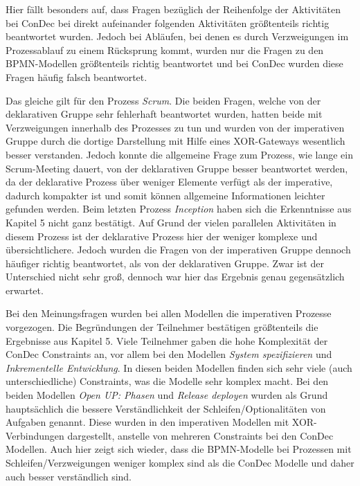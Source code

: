 Hier fällt besonders auf, dass Fragen bezüglich der Reihenfolge der Aktivitäten bei ConDec bei direkt aufeinander folgenden Aktivitäten größtenteils richtig beantwortet wurden. Jedoch bei Abläufen, bei denen es durch Verzweigungen im Prozessablauf zu einem Rücksprung kommt, wurden nur die Fragen zu den BPMN-Modellen größtenteils richtig beantwortet und bei ConDec wurden diese Fragen häufig falsch beantwortet.\newline

Das gleiche gilt für den Prozess \textit{Scrum}. Die beiden Fragen, welche von der deklarativen Gruppe sehr fehlerhaft beantwortet wurden, hatten beide mit Verzweigungen innerhalb des Prozesses zu tun und wurden von der imperativen Gruppe durch die dortige Darstellung mit Hilfe eines XOR-Gateways wesentlich besser verstanden. Jedoch konnte die allgemeine Frage zum Prozess, wie lange ein Scrum-Meeting dauert, von der deklarativen Gruppe besser beantwortet werden, da der deklarative Prozess über weniger Elemente verfügt als der imperative, dadurch kompakter ist und somit können allgemeine Informationen leichter gefunden werden. \newline
Beim letzten Prozess \textit{Inception} haben sich die Erkenntnisse aus Kapitel 5 nicht ganz bestätigt. Auf Grund der vielen parallelen Aktivitäten in diesem Prozess ist der deklarative Prozess hier der weniger komplexe und übersichtlichere. Jedoch wurden die Fragen von der imperativen Gruppe dennoch häufiger richtig beantwortet, als von der deklarativen Gruppe. Zwar ist der Unterschied nicht sehr groß, dennoch war hier das Ergebnis genau gegensätzlich erwartet.\newline

Bei den Meinungsfragen wurden bei allen Modellen die imperativen Prozesse vorgezogen. Die Begründungen der Teilnehmer bestätigen größtenteils die Ergebnisse aus Kapitel 5. Viele Teilnehmer gaben die hohe Komplexität der ConDec Constraints an, vor allem bei den Modellen \textit{System spezifizieren} und \textit{Inkrementelle Entwicklung}. In diesen beiden Modellen finden sich sehr viele (auch unterschiedliche) Constraints, was die Modelle sehr komplex macht.\newline
Bei den beiden Modellen \textit{Open UP: Phasen} und \textit{Release deployen} wurden als Grund hauptsächlich die bessere Verständlichkeit der Schleifen/Optionalitäten von Aufgaben genannt. Diese wurden in den imperativen Modellen mit XOR-Verbindungen dargestellt, anstelle von mehreren Constraints bei den ConDec Modellen. Auch hier zeigt sich wieder, dass die BPMN-Modelle bei Prozessen mit Schleifen/Verzweigungen weniger komplex sind als die ConDec Modelle und daher auch besser verständlich sind.\newline


